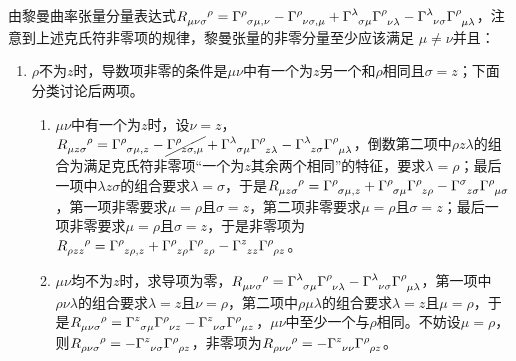 \begin{xiti}
\begin{jie}
		由黎曼曲率张量分量表达式$\displaystyle \tensor{R}{_\mu_\nu_\sigma^\rho}= \ChristoffelSymbol{\rho}{\sigma}{{\mu,\nu}}- \ChristoffelSymbol{\rho}{\nu}{{\sigma,\mu}}+ \ChristoffelSymbol{\lambda}{\sigma}{\mu} \ChristoffelSymbol{\rho}{\nu}{\lambda}- \ChristoffelSymbol{\lambda}{\nu}{\sigma} \ChristoffelSymbol{\rho}{\mu}{\lambda} $，注意到上述克氏符非零项的规律，黎曼张量的非零分量至少应该满足 $\mu \neq \nu$并且：
		\begin{enumerate}
			\item $\rho$不为$z$时，导数项非零的条件是$\mu\nu$中有一个为$z$另一个和$\rho$相同且$\sigma=z$；下面分类讨论后两项。
			\begin{enumerate}
				\item $\mu\nu$中有一个为$z$时，设$\nu=z$，$\displaystyle \tensor{R}{_\mu_z_\sigma^\rho}= \ChristoffelSymbol{\rho}{\sigma}{{\mu,z}}- \cancel{\ChristoffelSymbol{\rho}{z}{{\sigma,\mu}}}+ \ChristoffelSymbol{\lambda}{\sigma}{\mu} \ChristoffelSymbol{\rho}{z}{\lambda}- \ChristoffelSymbol{\lambda}{z}{\sigma} \ChristoffelSymbol{\rho}{\mu}{\lambda} $，倒数第二项中$\rho z\lambda$的组合为满足克氏符非零项“一个为$z$其余两个相同”的特征，要求$\lambda=\rho$；最后一项中$\lambda z\sigma $的组合要求$\lambda=\sigma$，于是$\displaystyle \tensor{R}{_\mu_z_\sigma^\rho}= \ChristoffelSymbol{\rho}{\sigma}{{\mu,z}}+ \ChristoffelSymbol{\rho}{\sigma}{\mu} \ChristoffelSymbol{\rho}{z}{\rho}- \ChristoffelSymbol{\sigma}{z}{\sigma} \ChristoffelSymbol{\rho}{\mu}{\sigma} $，第一项非零要求$\mu=\rho$且$\sigma=z$，第二项非零要求$\mu=\rho $且$\sigma=z$；最后一项非零要求$\mu=\rho$且$\sigma=z$，于是非零项为$\displaystyle \tensor{R}{_\rho_z_z^\rho}= \ChristoffelSymbol{\rho}{z}{{\rho,z}}+ \ChristoffelSymbol{\rho}{z}{\rho} \ChristoffelSymbol{\rho}{z}{\rho}- \ChristoffelSymbol{z}{z}{z} \ChristoffelSymbol{\rho}{\rho}{z} $。
				\item $\mu\nu$均不为$z$时，求导项为零，$\displaystyle \tensor{R}{_\mu_\nu_\sigma^\rho}=  \ChristoffelSymbol{\lambda}{\sigma}{\mu} \ChristoffelSymbol{\rho}{\nu}{\lambda}- \ChristoffelSymbol{\lambda}{\nu}{\sigma} \ChristoffelSymbol{\rho}{\mu}{\lambda} $，第一项中$\rho\nu\lambda$的组合要求$\lambda=z $且$\nu=\rho $，第二项中$\rho\mu\lambda$的组合要求$\lambda=z$且$\mu=\rho$，于是$\displaystyle \tensor{R}{_\mu_\nu_\sigma^\rho}=  \ChristoffelSymbol{z}{\sigma}{\mu} \ChristoffelSymbol{\rho}{\nu}{z}- \ChristoffelSymbol{z}{\nu}{\sigma} \ChristoffelSymbol{\rho}{\mu}{z} $，$\mu\nu$中至少一个与$\rho$相同。不妨设$\mu=\rho$，则$\displaystyle \tensor{R}{_\rho_\nu_\sigma^\rho}=- \ChristoffelSymbol{z}{\nu}{\sigma} \ChristoffelSymbol{\rho}{\rho}{z} $，非零项为$\displaystyle \tensor{R}{_\rho_\nu_\nu^\rho}=- \ChristoffelSymbol{z}{\nu}{\nu} \ChristoffelSymbol{\rho}{\rho}{z} $。

\end{enumerate}
\end{enumerate}
\end{jie}
\end{xiti}
